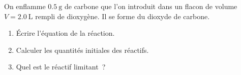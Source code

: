 On enflamme $\qty{0.5}{\g}$ de carbone que l'on introduit dans un flacon de
volume $V=\qty{2.0}{\L}$ rempli de dioxygène. Il se forme du dioxyde de carbone.
\begin{enumerate}
    \item Écrire l'équation de la réaction.
    \item Calculer les quantités initiales des réactifs.
    \item Quel est le réactif limitant~?
\end{enumerate}


